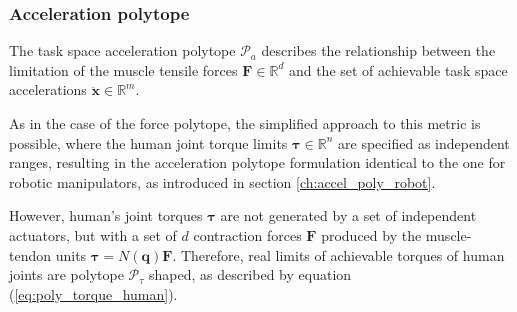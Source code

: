 \subsubsection{Acceleration polytope}
\label{ch:human_aceleration_poly}

The task space acceleration polytope $\mathcal{P}_a$ describes the relationship between the limitation of the muscle tensile forces $\bm{F}\in \mathbb{R}^d$ and the set of achievable task space accelerations $\ddot{\bm{x}}\in\mathbb{R}^m$.

As in the case of the force polytope, the simplified approach to this metric is possible, where the human joint torque limits $\bm{\tau}\in\mathbb{R}^n$ are specified as independent ranges, resulting in the acceleration polytope formulation identical to the one for robotic manipulators, as introduced in section \ref{ch:accel_poly_robot}. 

However, human's joint torques $\bm{\tau}$ are not generated by a set of independent actuators, but with a set of $d$ contraction forces $\bm{F}$ produced by the muscle-tendon units $\bm{\tau}=N(\bm{q}) \bm{F}$. Therefore, real limits of achievable torques of human joints are polytope $\mathcal{P}_\tau$ shaped, as described by equation (\ref{eq:poly_torque_human}). 

